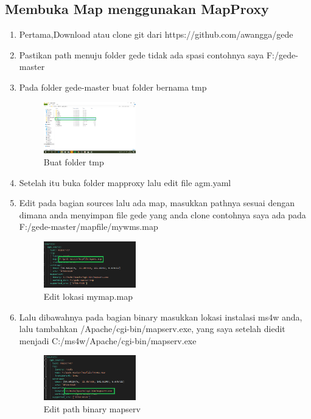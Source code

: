 \subsection{Membuka Map menggunakan MapProxy}
\begin{enumerate}
  \item Pertama,Download atau clone git dari https://github.com/awangga/gede
  \item Pastikan path menuju folder gede tidak ada spasi contohnya saya F:/gede-master
  \item Pada folder gede-master buat folder bernama tmp
  \hfill\break
  \begin{figure}[H]
  \includegraphics[width=4cm]{figures/tugas4/1174054/26.png}
  \centering
  \caption{Buat folder tmp}
  \end{figure}
  \item Setelah itu buka folder mapproxy lalu edit file agm.yaml
  \item Edit pada bagian sources lalu ada map, masukkan pathnya sesuai dengan dimana anda menyimpan file gede yang anda clone contohnya saya ada pada F:/gede-master/mapfile/mywms.map
  \hfill\break
  \begin{figure}[H]
  \includegraphics[width=4cm]{figures/tugas4/1174054/27.png}
  \centering
  \caption{Edit lokasi mymap.map}
  \end{figure}
  \item Lalu dibawahnya pada bagian binary masukkan lokasi instalasi ms4w anda, lalu tambahkan /Apache/cgi-bin/mapserv.exe, yang saya setelah diedit menjadi C:/ms4w/Apache/cgi-bin/mapserv.exe
  \hfill\break
  \begin{figure}[H]
  \includegraphics[width=4cm]{figures/tugas4/1174054/28.png}
  \centering
  \caption{Edit path binary mapserv}
  \end{figure}


\end{enumerate}
